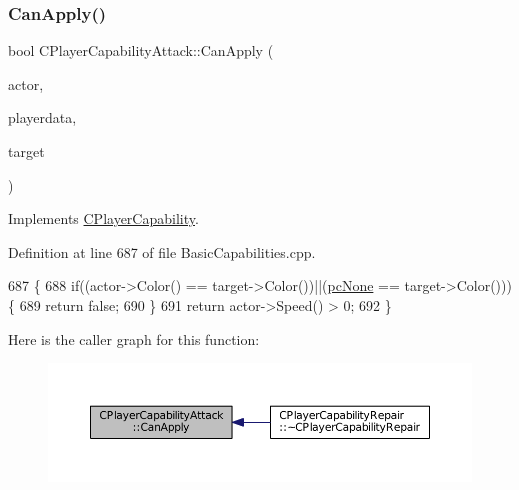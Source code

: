 \hypertarget{classCPlayerCapabilityAttack_ab5cdd55fa3838304fd551426e41f7b17}{}\label{classCPlayerCapabilityAttack_ab5cdd55fa3838304fd551426e41f7b17} 
\subsubsection{\texorpdfstring{Can\+Apply()}{CanApply()}}
{\footnotesize\ttfamily bool C\+Player\+Capability\+Attack\+::\+Can\+Apply (\begin{DoxyParamCaption}\item[{std\+::shared\+\_\+ptr$<$ \hyperlink{classCPlayerAsset}{C\+Player\+Asset} $>$}]{actor,  }\item[{std\+::shared\+\_\+ptr$<$ \hyperlink{classCPlayerData}{C\+Player\+Data} $>$}]{playerdata,  }\item[{std\+::shared\+\_\+ptr$<$ \hyperlink{classCPlayerAsset}{C\+Player\+Asset} $>$}]{target }\end{DoxyParamCaption})\hspace{0.3cm}{\ttfamily [virtual]}}



Implements \hyperlink{classCPlayerCapability_ae96263e0950f496492f8baeb877b9554}{C\+Player\+Capability}.



Definition at line 687 of file Basic\+Capabilities.\+cpp.


\begin{DoxyCode}
687                                                                                                            
                                                   \{
688     \textcolor{keywordflow}{if}((actor->Color() == target->Color())||(\hyperlink{GameDataTypes_8h_aafb0ca75933357ff28a6d7efbdd7602fa88767aa8e02c7b3192bbab4127b3d729}{pcNone} == target->Color()))\{
689         \textcolor{keywordflow}{return} \textcolor{keyword}{false};   
690     \}
691     \textcolor{keywordflow}{return} actor->Speed() > 0;
692 \}
\end{DoxyCode}
Here is the caller graph for this function\+:
\nopagebreak
\begin{figure}[H]
\begin{center}
\leavevmode
\includegraphics[width=350pt]{classCPlayerCapabilityAttack_ab5cdd55fa3838304fd551426e41f7b17_icgraph}
\end{center}
\end{figure}
\hypertarget{classCPlayerCapabilityAttack_ab1cda67a8e637a90accf03d1581d4072}{}\label{classCPlayerCapabilityAttack_ab1cda67a8e637a90accf03d1581d4072} 
